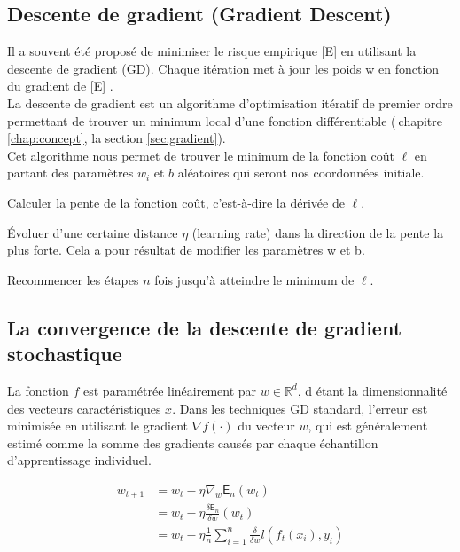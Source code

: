 	
	\subsection{Descente de gradient (Gradient Descent)} \label{sec:gradient_descent}
	
	Il a souvent été proposé de minimiser le risque empirique [E] en utilisant la descente de gradient (GD). Chaque itération met à jour les poids w en fonction du gradient de [E] \cite{bottou2012stochastic}.\\
	La descente de gradient est un algorithme d'optimisation itératif de premier ordre permettant de trouver un minimum local d'une fonction différentiable (\cf$ \ $chapitre \ref{chap:concept}, la section \ref{sec:gradient}).\\
	Cet algorithme nous permet de trouver le minimum de la fonction coût $\ell$  en partant des paramètres $w_i$ et $b$ aléatoires qui seront nos coordonnées initiale.
	\begin{list}{--}{}
		\item Calculer la pente de la fonction coût, c’est-à-dire la dérivée de $\ell$.
		\item Évoluer d’une certaine distance $\eta$ (learning rate) dans la direction de la pente la plus forte. Cela a pour résultat de modifier les paramètres w et b.
		\item Recommencer les étapes $n$ fois jusqu’à atteindre le minimum de $\ell$.
	\end{list}
	
		
	\subsection{La convergence de la descente de gradient stochastique} \label{sec:convergence_sgd}
	
	La fonction $f$ est paramétrée linéairement par $w \in \mathbb{R}^d$, d étant la dimensionnalité des vecteurs caractéristiques $x$. Dans les techniques GD standard, l’erreur est minimisée en utilisant le gradient $\nabla f(\cdot)$ du vecteur $w$, qui est généralement estimé comme la somme des gradients causés par chaque échantillon d'apprentissage individuel.
	
	\begin{equation*}
		\begin{split}
		w_{t+1}  & = w_t - \eta {\nabla_w \mathsf{E}_n (w_t)} \\
		& = w_t - \eta {\frac {\delta \mathsf{E}_n }{\delta w}(w_t)} \\
		& = w_t - \eta \frac{1}{n} \sum_{i=1}^{n}  {\frac {\delta }{\delta w} l(f_t(x_i),y_i)}
		\end{split}
	\end{equation*}
	
